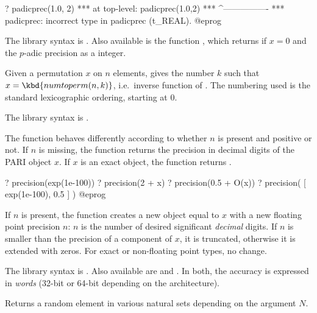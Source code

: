 ? padicprec(1.0, 2)
 ***   at top-level: padicprec(1.0,2)
 ***                 ^----------------
 *** padicprec: incorrect type in padicprec (t_REAL).
@eprog

The library syntax is .
Also available is the function ,
which returns  if $x = 0$ and the $p$-adic precision as a
 integer.

\label{se:permtonum}
Given a permutation $x$ on $n$ elements, gives the number $k$ such that
$x=\kbd{numtoperm(n,k)}$, i.e.~inverse function of .
The numbering used is the standard lexicographic ordering, starting at $0$.

The library syntax is .

\label{se:precision}
The function behaves differently according to whether $n$ is
present and positive or not. If $n$ is missing, the function returns the
precision in decimal digits of the PARI object $x$. If $x$ is an exact
object, the function returns .

\bprog
? precision(exp(1e-100))
? precision(2 + x)
? precision(0.5 + O(x))
? precision( [ exp(1e-100), 0.5 ] )
@eprog

If $n$ is present, the function creates a new object equal to $x$ with a new
floating point precision $n$: $n$ is the number of desired significant
\emph{decimal} digits. If $n$ is smaller than the precision of a 
component of $x$, it is truncated, otherwise it is extended with zeros.
For exact or non-floating point types, no change.

The library syntax is .
Also available are  and
. In both, the accuracy is expressed in
\emph{words} (32-bit or 64-bit depending on the architecture).

\label{se:random}
Returns a random element in various natural sets depending on the
argument $N$.

